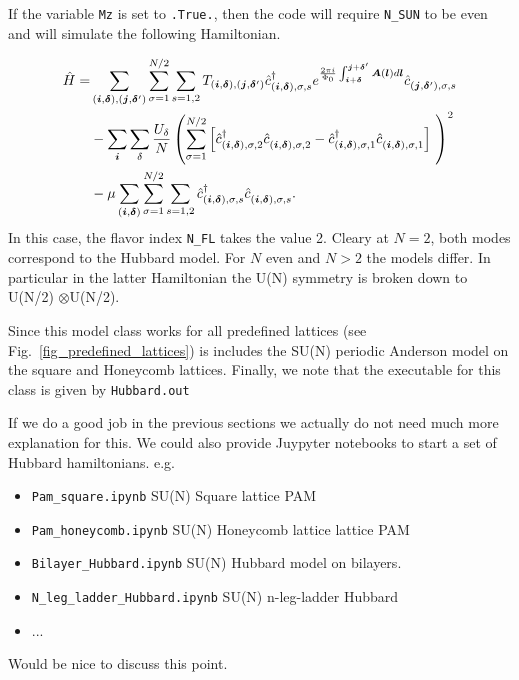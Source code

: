 If the variable \texttt{Mz} is set to \texttt{.True.}, then the code    will require  \texttt{N\_SUN}  to be even and will simulate the following Hamiltonian. 

\begin{align}
\hat{H} =& \sum_{(\ve{i},\ve{\delta}), (\ve{j},\ve{\delta}')}  \sum_{\sigma =1}^{N/2}  \sum_{s=1,2} T_{(\ve{i},\ve{\delta}), (\ve{j},\ve{\delta}')}    \hat{c}^{\dagger}_{(\ve{i},\ve{\delta}), \sigma,s }   e^{\frac{2 \pi i}{\Phi_0} \int_{\ve{i} + \ve{\delta}}^{\ve{j} + \ve{\delta}'}  
     \vec{A}(\ve{l})  d \ve{l}} \hat{c}^{}_{(\ve{j},\ve{\delta}'),\sigma,s}     \nonumber   \\
    &- \sum_{\vec{i}} \sum_{\delta}   \frac{U_\delta}{N} \left(\sum_{\sigma=1}^{N/2}  \left[   \hat{c}^{\dagger}_{(\vec{i},\ve{\delta}),\sigma, 2} 
    \hat{c}^{\phantom\dagger}_{(\vec{i}, \ve{\delta}),\sigma,2 }  -  \hat{c}^{\dagger}_{(\vec{i},\ve{\delta}),\sigma, 1} 
    \hat{c}^{\phantom\dagger}_{(\vec{i}, \ve{\delta}),\sigma,1} \right] \right)^2  \nonumber \\
    & - \mu \sum_{(\ve{i},\ve{\delta})}  \sum_{\sigma =1}^{N/2}  \sum_{s=1,2}\hat{c}^{\dagger}_{(\vec{i},\ve{\delta}),\sigma, s} \hat{c}^{\phantom\dagger}_{(\vec{i},\ve{\delta}),\sigma, s}.
\end{align}
In this case, the flavor index \texttt{N\_FL}   takes the value 2. Cleary at $N=2$, both modes  correspond  to the Hubbard model.  For $N$  even and $N > 2$  the models differ.  In particular  in the latter  Hamiltonian the U(N) symmetry is broken down to  U(N/2) $\otimes $U(N/2).  

Since this model class  works for all predefined lattices  (see Fig.~\ref{fig_predefined_lattices})  is includes the SU(N) periodic Anderson model on   the square and Honeycomb lattices.     Finally,  we note that the executable for this class is given by \texttt{Hubbard.out}

{\color{red}  If we do a good job in the previous sections we actually do not need much more explanation for this.   We could also provide Juypyter notebooks to start a set of Hubbard  hamiltonians.  e.g.  
\begin{itemize}
\item   \texttt{Pam\_square.ipynb}            SU(N) Square lattice PAM 
\item  \texttt{Pam\_honeycomb.ipynb}     SU(N) Honeycomb lattice lattice PAM 
\item  \texttt{Bilayer\_Hubbard.ipynb}      SU(N) Hubbard model on bilayers.
\item  \texttt{N\_leg\_ladder\_Hubbard.ipynb}   SU(N) n-leg-ladder  Hubbard
\item ...
\end{itemize} 
Would be nice to discuss this point.}



